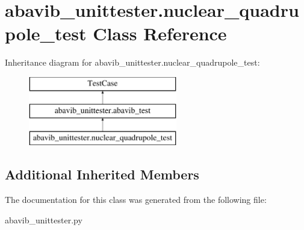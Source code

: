 \hypertarget{classabavib__unittester_1_1nuclear__quadrupole__test}{\section{abavib\+\_\+unittester.\+nuclear\+\_\+quadrupole\+\_\+test Class Reference}
\label{classabavib__unittester_1_1nuclear__quadrupole__test}
}
Inheritance diagram for abavib\+\_\+unittester.\+nuclear\+\_\+quadrupole\+\_\+test\+:\begin{figure}[H]
\begin{center}
\leavevmode
\includegraphics[height=3.000000cm]{classabavib__unittester_1_1nuclear__quadrupole__test}
\end{center}
\end{figure}
\subsection*{Additional Inherited Members}


The documentation for this class was generated from the following file\+:\begin{DoxyCompactItemize}
\item 
abavib\+\_\+unittester.\+py\end{DoxyCompactItemize}
